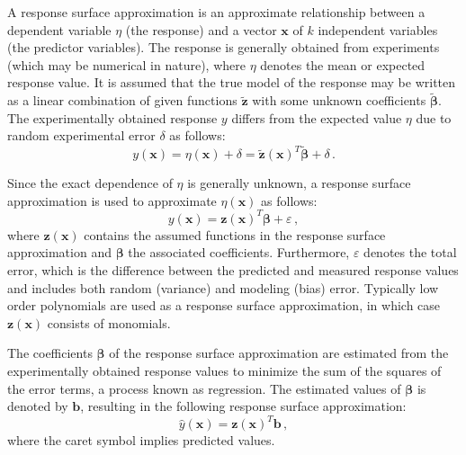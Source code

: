 \documentclass[stropt]{svjour}
\def\xx{\mathbf{x}}%
\def\zz{\mathbf{z}}%
\def\bb{\mathbf{\beta}}%
\def\kb{\mathbf{b}}%
\begin{document}
A response surface approximation is an approximate relationship between a
dependent variable $\eta$ (the response) and a vector $\xx$ of $k$
independent variables (the predictor variables).
The response is generally obtained from experiments (which may be numerical
in nature), where $\eta$ denotes the mean or expected response value.
It is assumed that the true model of the response may be written as a linear
combination of given functions $\tilde{\zz}$ with some unknown coefficients
$\tilde{\bb}$.
The experimentally obtained response $y$ differs from the expected value
$\eta$ due to random experimental error $\delta$ as follows:
\begin{equation}
y(\xx)=\eta(\xx)+\delta=\tilde{\zz}(\xx)^T \tilde{\bb}+\delta\, .
\label{eq08}
\end{equation}

Since the exact dependence of $\eta$ is generally unknown, a response surface
approximation is used to approximate $\eta(\xx)$ as follows:
\begin{equation}
y(\xx)=\zz(\xx)^T\bb+\varepsilon\, ,
\label{eq09}
\end{equation}
where $\zz(\xx)$ contains the assumed functions in the response surface
approximation and $\bb$ the associated coefficients.
Furthermore, $\varepsilon$ denotes the total error, which is the
difference between the predicted and measured response values and includes
both random (variance) and modeling (bias) error.
Typically low order polynomials are used as a response surface approximation,
in which case $\zz(\xx)$ consists of monomials.

The coefficients $\bb$ of the response surface approximation are estimated
from the experimentally obtained response values to minimize the sum of the
squares of the error terms, a process known as regression.
The estimated values of $\bb$ is denoted by $\kb$, resulting in the
following response surface approximation:
\begin{equation}
\hat{y}(\xx)=\zz(\xx)^T\kb\, ,
\label{eq10}
\end{equation}
where the caret symbol implies predicted values.
\end{document}
